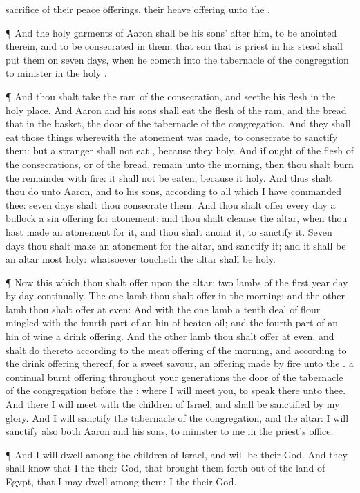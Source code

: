 {sacrifice of their peace
offerings,
{} their heave
offering unto the
{}.
\par }{\PP {}¶ And the
holy
garments of
Aaron shall be his
sons’
after him, to be
anointed therein, and to be
consecrated in them.
 that
son that is
priest in his stead shall
put them on
seven
days, when he
cometh into the
tabernacle of the
congregation to
minister in the
holy
{}.
\par }{\PP {}¶ And thou shalt
take the
ram of the
consecration, and
seethe his
flesh in the
holy
place.
And
Aaron and his
sons shall
eat the
flesh of the
ram, and the
bread that
{} in the
basket,
{} the
door of the
tabernacle of the
congregation.
And they shall
eat those things wherewith the atonement was
made, to
consecrate
{} to
sanctify them: but a
stranger shall not
eat
{}, because they
{}
holy.
And if ought of the
flesh of the
consecrations, or of the
bread,
remain unto the
morning, then thou shalt
burn the
remainder with
fire: it shall not be
eaten, because it
{}
holy.
And thus shalt thou
do unto
Aaron, and to his
sons, according to all
{} which I have
commanded thee:
seven
days shalt thou
consecrate them.
And thou shalt
offer every
day a
bullock
{} a sin
offering for
atonement: and thou shalt
cleanse the
altar, when thou hast made an
atonement for it, and thou shalt
anoint it, to
sanctify it.
Seven
days thou shalt make an
atonement for the
altar, and
sanctify it; and it shall be an
altar most
holy: whatsoever
toucheth the
altar shall be
holy.
\par }{\PP {}¶ Now this
{} which thou shalt
offer upon the
altar;
two
lambs of the
first
year
day by
day
continually.
The
one
lamb thou shalt
offer in the
morning; and the
other
lamb thou shalt
offer at
even:
And with the
one
lamb a
tenth deal of
flour
mingled with the fourth
part of an
hin of
beaten
oil; and the fourth
part of an
hin of
wine
{} a drink
offering.
And the
other
lamb thou shalt
offer at
even, and shalt
do thereto according to the meat
offering of the
morning, and according to the drink
offering thereof, for a
sweet
savour, an offering made by
fire unto the
{}.
 a
continual burnt
offering throughout your
generations
{} the
door of the
tabernacle of the
congregation
before the
{}: where I will
meet you, to
speak there unto thee.
And there I will
meet with the
children of
Israel, and
{} shall be
sanctified by my
glory.
And I will
sanctify the
tabernacle of the
congregation, and the
altar: I will
sanctify also both
Aaron and his
sons, to minister to me in the
priest’s office.
\par }{\PP {}¶ And I will
dwell
among the
children of
Israel, and will be their
God.
And they shall
know that I
{} the
{} their
God, that brought them
forth out of the
land of
Egypt, that I may
dwell
among them: I
{} the
{} their
God.

}
